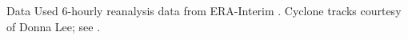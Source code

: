 \begin{block}{Data Used}
    6-hourly reanalysis data from ERA-Interim \cite{Dee2011}.
    Cyclone tracks courtesy of Donna Lee; see \cite{Booth2015}.
\end{block}
